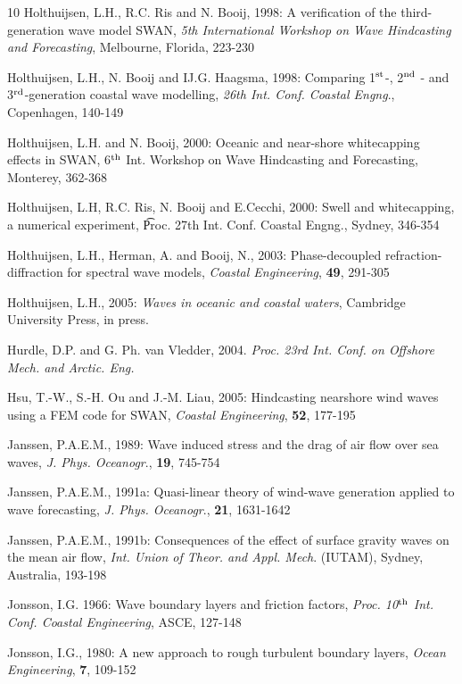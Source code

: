 \documentclass[12pt]{book}
\begin{document}
\begin{thebibliography}{10}
Holthuijsen, L.H., R.C. Ris and N. Booij, 1998: A verification of the third-generation wave model SWAN,
{\it 5th International Workshop on Wave Hindcasting and Forecasting}, Melbourne, Florida, 223-230

Holthuijsen, L.H., N. Booij and IJ.G. Haagsma, 1998: Comparing 1$^{{\rm st}}$-, 2$^{{\rm nd}}$ - and 3$^{{\rm rd}}$-generation
coastal wave modelling,  {\it 26th Int. Conf. Coastal Engng}., Copenhagen, 140-149

Holthuijsen, L.H. and N. Booij, 2000: Oceanic and near-shore whitecapping effects in SWAN, 6$^{{\rm th}}$ Int.
Workshop on Wave Hindcasting and Forecasting, Monterey, 362-368

Holthuijsen, L.H, R.C. Ris, N. Booij and E.Cecchi, 2000: Swell and whitecapping, a numerical experiment,
{\t Proc. 27th Int. Conf. Coastal Engng.}, Sydney, 346-354

Holthuijsen, L.H., Herman, A. and Booij, N., 2003: Phase-decoupled refraction-diffraction for
spectral wave models, {\it Coastal Engineering}, {\bf 49}, 291-305

Holthuijsen, L.H., 2005: {\it Waves in oceanic and coastal waters},
Cambridge University Press, in press.

Hurdle, D.P. and G. Ph. van Vledder, 2004. {\it Proc. 23rd Int. Conf. on Offshore Mech. and Arctic. Eng.}

Hsu, T.-W., S.-H. Ou and J.-M. Liau, 2005: Hindcasting nearshore wind waves using a FEM code for SWAN,
{\it Coastal Engineering}, {\bf 52}, 177-195

Janssen, P.A.E.M., 1989: Wave induced stress and the drag of air flow over sea waves, {\it J. Phys.
Oceanogr}., {\bf 19}, 745-754

Janssen, P.A.E.M., 1991a: Quasi-linear theory of wind-wave generation applied to wave forecasting, {\it J.
Phys. Oceanogr}., {\bf 21}, 1631-1642

Janssen, P.A.E.M., 1991b: Consequences of the effect of surface gravity waves on the mean air flow, {\it Int.
Union of Theor. and Appl. Mech}. (IUTAM), Sydney, Australia, 193-198

Jonsson, I.G. 1966: Wave boundary layers and friction factors, {\it Proc. 10$^{{\rm th}}$ Int. Conf. Coastal Engineering},
ASCE, 127-148

Jonsson, I.G., 1980: A new approach to rough turbulent boundary layers, {\it Ocean Engineering}, {\bf 7}, 109-152


\end{thebibliography}
\end{document}
